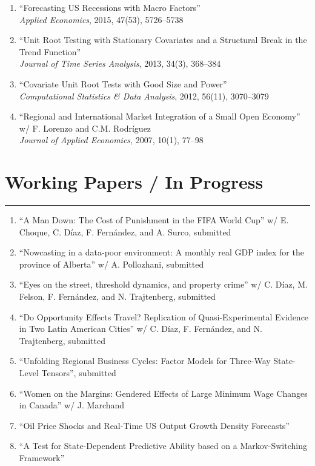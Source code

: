 \documentclass[overlapped,letterpaper,11pt]{res}
\newcommand{\doi}[1]{\href{https://doi.org/#1}{%
  \doibox{\textcolor{doiblue}{\scriptsize\bfseries DOI}}}}
\newcommand{\cvrule}{%
  \hspace*{-\sectionwidth}%
  \rule[2mm]{\dimexpr\textwidth+\sectionwidth\relax}{.25pt}}
\newcommand{\cvsection}[1]{%
  \needspace{4\baselineskip}%
  \section{\textbf{#1}}%
  \cvrule}
\newenvironment{cventries}%
  {\begin{enumerate}\interlinepenalty=10000\relax}%
  {\end{enumerate}}
\begin{document}
\begin{resume}
\begin{cventries}
\item ``Forecasting US Recessions with Macro Factors'' \\
	\textit{Applied Economics}, 2015, 47(53), 5726--5738 \doi{10.1080/00036846.2015.1058904}
\item ``Unit Root Testing with Stationary Covariates and a Structural Break in the Trend Function'' \\
	\textit{Journal of Time Series Analysis}, 2013, 34(3), 368--384 \doi{10.1111/jtsa.12020}
\item ``Covariate Unit Root Tests with Good Size and Power'' \\
	\textit{Computational Statistics \& Data Analysis}, 2012, 56(11), 3070--3079 \doi{10.1016/j.csda.2011.05.019}
\item ``Regional and International Market Integration of a Small Open Economy'' \\
	w/ F. Lorenzo and C.M. Rodr\'iguez \\
	\textit{Journal of Applied Economics}, 2007, 10(1), 77--98 \doi{10.1080/15140326.2007.12040482}
\end{cventries}


\cvsection{Working Papers / In Progress}
\begin{cventries}
	\item ``A Man Down: The Cost of Punishment in the FIFA World Cup'' w/ E. Choque,
	C. D\'iaz, F. Fern\'andez, and A. Surco, submitted
	\item ``Nowcasting in a data-poor environment: A monthly real GDP index for the province of Alberta''
	w/ A. Pollozhani, submitted
	\item ``Eyes on the street, threshold dynamics, and property crime'' w/ C. D\'iaz, M. Felson,
	F. Fern\'andez, and N. Trajtenberg, submitted
	\item ``Do Opportunity Effects Travel? Replication of Quasi-Experimental Evidence in Two Latin 
	American Cities'' w/ C. D\'iaz, F. Fern\'andez, and N. Trajtenberg, submitted
	\item ``Unfolding Regional Business Cycles: Factor Models for Three-Way State-Level Tensors'', 
	submitted
	\item ``Women on the Margins: Gendered Effects of Large Minimum Wage Changes in Canada'' 
	w/ J. Marchand
	\item ``Oil Price Shocks and Real-Time US Output Growth Density Forecasts''
	\item ``A Test for State-Dependent Predictive Ability based on a Markov-Switching Framework''
\end{cventries}



\end{resume}
\end{document}
